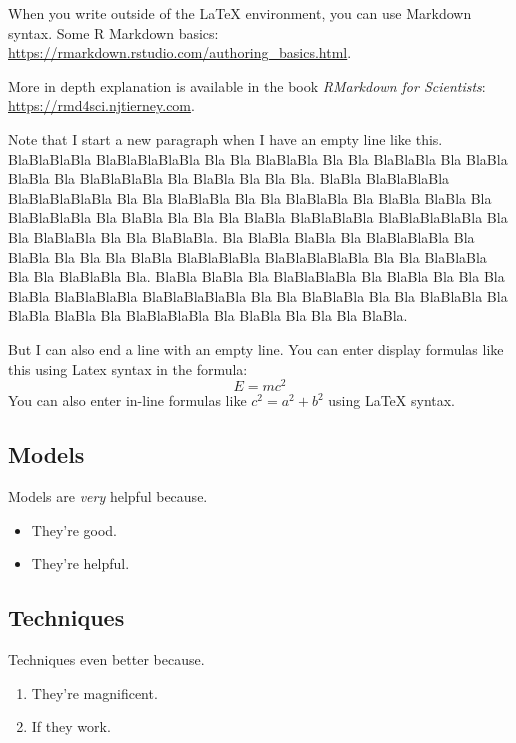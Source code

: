 \documentclass[
  11pt,
  twoside,
  11pt]{article}
\numberwithin{Theorem}{section}
\numberwithin{Definition}{section}
\numberwithin{Lemma}{section}
\numberwithin{Algorithm}{section}
\numberwithin{equation}{section}
\begin{document}
When you write outside of the LaTeX environment, you can use Markdown syntax. Some R Markdown basics: \url{https://rmarkdown.rstudio.com/authoring_basics.html}.

More in depth explanation is available in the book \emph{RMarkdown for Scientists}:\\
\url{https://rmd4sci.njtierney.com}.

Note that I start a new paragraph when I have an empty line like this. BlaBlaBlaBla BlaBlaBlaBlaBla Bla Bla BlaBlaBla Bla Bla BlaBlaBla Bla BlaBla BlaBla Bla BlaBlaBlaBla Bla BlaBla Bla Bla Bla. BlaBla BlaBlaBlaBla BlaBlaBlaBlaBla Bla Bla BlaBlaBla Bla Bla BlaBlaBla Bla BlaBla BlaBla Bla BlaBlaBlaBla Bla BlaBla Bla Bla Bla BlaBla BlaBlaBlaBla BlaBlaBlaBlaBla Bla Bla BlaBlaBla Bla Bla BlaBlaBla. Bla BlaBla BlaBla Bla BlaBlaBlaBla Bla BlaBla Bla Bla Bla BlaBla BlaBlaBlaBla BlaBlaBlaBlaBla Bla Bla BlaBlaBla Bla Bla BlaBlaBla Bla. BlaBla BlaBla Bla BlaBlaBlaBla Bla BlaBla Bla Bla Bla BlaBla BlaBlaBlaBla BlaBlaBlaBlaBla Bla Bla BlaBlaBla Bla Bla BlaBlaBla Bla BlaBla BlaBla Bla BlaBlaBlaBla Bla BlaBla Bla Bla Bla BlaBla.

But I can also end a line with an empty line. You can enter display formulas like this using Latex syntax in the formula: \[
E = mc^2
\] You can also enter in-line formulas like \(c^2=a^2+b^2\) using LaTeX syntax.

\newpage

\subsection{Models}
\label{sec:Models}

Models are \emph{very} helpful because.
\begin{itemize}
 \item They're good.
 \item They're helpful.
\end{itemize}
\clearpage

\subsection{Techniques}
\label{sec:Techniques}

Techniques even better because.
\begin{enumerate}
 \item They're magnificent.
 \item If they work.
\end{enumerate}
\clearpage
\end{document}
